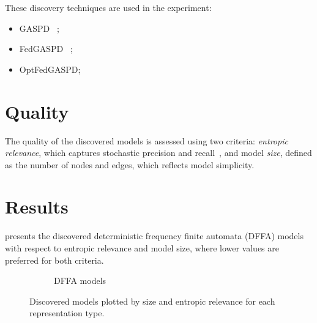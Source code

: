 \documentclass{article}
\begin{document}
These discovery techniques are used in the experiment:
\begin{itemize}
\item GASPD ~\cite{Hanan2024};
\item FedGASPD ~\cite{zhian2025C};
\item OptFedGASPD;
\end{itemize}
\section{Quality}
\label{sec:quality}
The quality of the discovered models is assessed using two criteria: \emph{entropic relevance}, which captures stochastic precision and recall~\cite{AlkhammashPMG22}, and model \emph{size}, defined as the number of nodes and edges, which reflects model simplicity.

\section{Results}
\label{sec:results}
 presents the discovered deterministic frequency finite automata (DFFA) models with respect to entropic relevance and model size, where lower values are preferred for both criteria.
\begin{figure}[h!]
\centering
\begin{subfigure}[b]{0.99\textwidth}
\centering
{}
\caption{DFFA models}
\label{fig:quality:dffa}
\end{subfigure}
\caption{Discovered models plotted by size and entropic relevance for each representation type.}
\label{fig:quality}
\end{figure}
\end{document}
